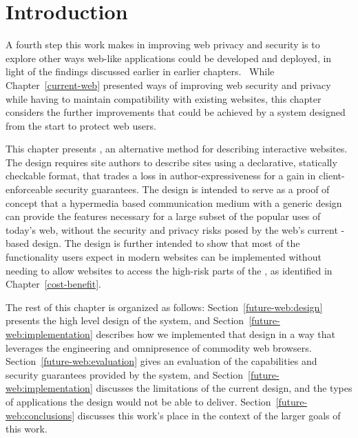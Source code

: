 \section{Introduction}
\label{future-web:introduction}

A fourth step this work makes in improving web privacy and security is to explore
other ways web-like applications could be developed and deployed, in light of
the findings discussed earlier in earlier chapters.  While Chapter~\ref{current-web}
presented ways of improving web security and privacy while having to maintain
compatibility with existing websites, this chapter considers the further
improvements that could be achieved by a system designed from the start to
protect web users.

This chapter presents \CDF, an alternative method for describing interactive
websites. The design requires site authors to describe sites using a declarative,
statically checkable format, that trades a loss in author-expressiveness for
a gain in client-enforceable security guarantees.  The design is intended to
serve as a proof of concept that a hypermedia based communication medium with a
generic design can provide the features necessary
for a large subset of the popular uses of today's web, without the security
and privacy risks posed by the web's current \JS-based design.
The design is further intended to show that most of the functionality
users expect in modern websites can be implemented without needing to allow
websites to access the high-risk parts of the \WAPI, as identified in
Chapter~\ref{cost-benefit}.

The rest of this chapter is organized as follows: Section~\ref{future-web:design}
presents the high level design of the system, and Section~\ref{future-web:implementation}
describes how we implemented that design in a way that leverages the engineering
and omnipresence of commodity web browsers.  Section~\ref{future-web:evaluation}
gives an evaluation of the capabilities and security guarantees provided by the
system, and Section~\ref{future-web:implementation} discusses the limitations
of the current design, and the types of applications the design would not be
able to deliver.  Section~\ref{future-web:conclusions} discusses
this work's place in the context of the larger goals of this work.